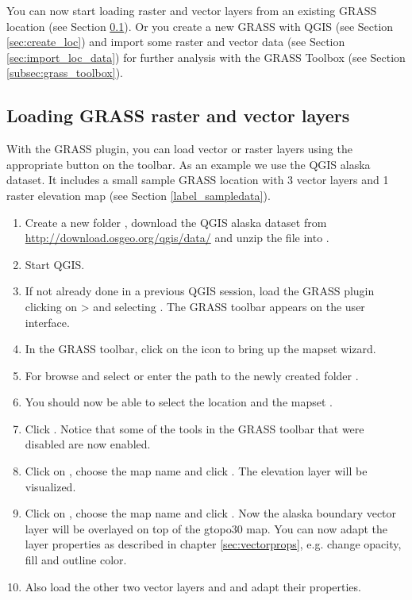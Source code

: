 You can now start loading raster and vector layers from an existing GRASS location (see Section \ref{sec:load_grassdata}). Or you create a new GRASS  with QGIS (see Section \ref{sec:create_loc}) and import some raster and vector data (see Section \ref{sec:import_loc_data}) for further analysis with the GRASS Toolbox (see Section \ref{subsec:grass_toolbox}).

\subsection{Loading GRASS raster and vector layers}\label{sec:load_grassdata}

With the GRASS plugin, you can load vector or raster layers using the
appropriate button on the toolbar. As an example we use the QGIS alaska
dataset. It includes a small sample GRASS location with 3 vector layers and 1
raster elevation map (see Section \ref{label_sampledata}).

\begin{enumerate}
  \item Create a new folder , download the QGIS alaska
  dataset  from
  \url{http://download.osgeo.org/qgis/data/} and unzip the file into
  . 
  \item Start QGIS.
  \item If not already done in a previous QGIS session, load the GRASS plugin
  clicking on  >  and
  selecting . The GRASS toolbar appears on the user
  interface.
  \item In the GRASS toolbar, click on the  icon to bring up the mapset wizard.
  \item For  browse and select or enter the path to the
  newly created folder .
  \item You should now be able to select the location 
  and the mapset . 
  \item Click . Notice that some of the tools in the GRASS toolbar
  that were disabled are now enabled.
  \item Click on ,
  choose the map name  and click . The elevation
  layer will be visualized. 
  \item Click on ,
  choose the map name  and click . Now the alaska
  boundary vector layer will be overlayed on top of the gtopo30 map. You can
  now adapt the layer properties as described in chapter \ref{sec:vectorprops},
  e.g. change opacity, fill and outline color.
  \item Also load the other two vector layers  and
   and adapt their properties.
\end{enumerate}

